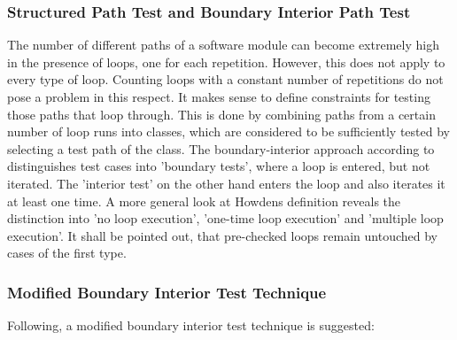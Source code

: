 	\subsubsection{Structured Path Test and Boundary Interior Path Test}

	The number of different paths of a software module can become extremely high in the presence of loops, one for each repetition. However, this does not apply to every type of loop. Counting loops with a constant number of repetitions do not pose a problem in this respect. It makes sense to define constraints for testing those paths that loop through. This is done by combining paths from a certain number of loop runs into classes, which are considered to be sufficiently tested by selecting a test path of the class. The boundary-interior approach according to  distinguishes test cases into 'boundary tests', where a loop is entered, but not iterated. The 'interior test' on the other hand enters the loop and also iterates it at least one time. A more general look at Howdens definition reveals the distinction into 'no loop execution', 'one-time loop execution' and 'multiple loop execution'. It shall be pointed out, that pre-checked loops remain untouched by cases of the first type.




	\subsubsection{Modified Boundary Interior Test Technique}

	Following, a modified boundary interior test technique is suggested:


